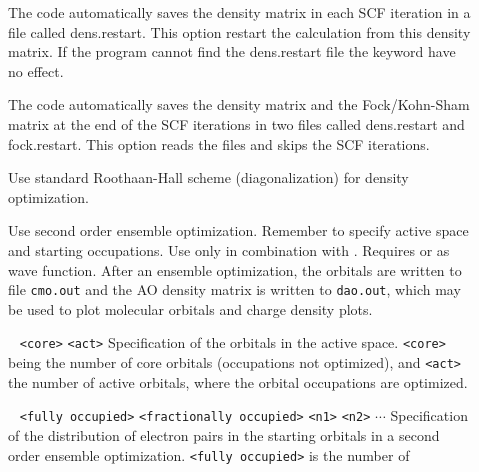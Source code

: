 \begin{description}
\item[] The code automatically saves the density matrix in each SCF iteration in a file called dens.restart. This option restart the calculation from this density matrix. If the program cannot find the dens.restart file the keyword have no effect. 
\item[] The code automatically saves the density matrix and the Fock/Kohn-Sham matrix at the end of the SCF iterations in two files called dens.restart and fock.restart. This option reads the files and skips the SCF iterations.
\item[] Use standard Roothaan-Hall scheme (diagonalization) for density optimization.
\item[]
Use second order ensemble optimization. Remember to specify active space and starting occupations. Use only in combination with . 
Requires  or  as wave function. After an ensemble optimization, the orbitals are written to file \verb|cmo.out| and the AO 
density matrix is written to \verb|dao.out|, which may be used to plot molecular orbitals and charge density plots.
\item[] \verb| | \newline
\verb|<core>| \verb|<act>|\newline
Specification of the orbitals in the active space. \verb|<core>| being the number of core orbitals (occupations not optimized), and \verb|<act>| the number 
of active orbitals, where the orbital occupations are optimized.
\item[] \verb| | \newline
\verb|<fully occupied>|\newline 
\verb|<fractionally occupied>|\newline
\verb|<n1>| \verb|<n2>| $\cdots$ \newline
Specification of the distribution of electron pairs in the starting orbitals in a second order ensemble optimization. \verb|<fully occupied>| is the number of 

\end{description}
